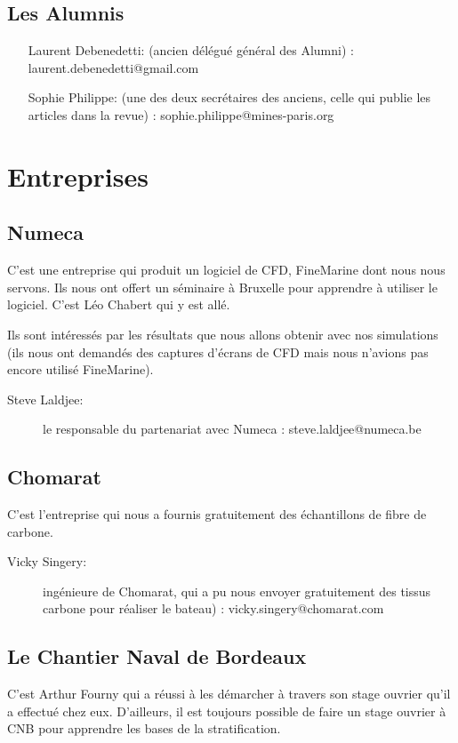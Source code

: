 \documentclass[a4paper, 11pt]{report}
\begin{document}
\subsection{Les Alumnis}
\begin{itemize}
\item[Laurent Debenedetti:](ancien délégué général des Alumni) : laurent.debenedetti@gmail.com
\item[Sophie Philippe:](une des deux secrétaires des anciens, celle qui publie les articles dans la revue) : sophie.philippe@mines-paris.org
\end{itemize}

\section{Entreprises}

\subsection{Numeca}
C'est une entreprise qui produit un logiciel de CFD, FineMarine dont nous nous servons. Ils nous ont offert un séminaire à Bruxelle pour apprendre à utiliser le logiciel. C'est Léo Chabert qui y est allé.

Ils sont intéressés par les résultats que nous allons obtenir avec nos simulations (ils nous ont demandés des captures d'écrans de CFD mais nous n'avions pas encore utilisé FineMarine).
\begin{description}
\item[Steve Laldjee:]le responsable du partenariat avec Numeca : steve.laldjee@numeca.be
\end{description}


\subsection{Chomarat}
C'est l'entreprise qui nous a fournis gratuitement des échantillons de fibre de carbone.
\begin{description}
\item[Vicky Singery:]ingénieure de Chomarat, qui a pu nous envoyer gratuitement des tissus carbone pour réaliser le bateau) : vicky.singery@chomarat.com
\end{description}

\subsection{Le Chantier Naval de Bordeaux}
C'est Arthur Fourny qui a réussi à les démarcher à travers son stage ouvrier qu'il a effectué chez eux. D'ailleurs, il est toujours possible de faire un stage ouvrier à CNB pour apprendre les bases de la stratification.
\end{document}
